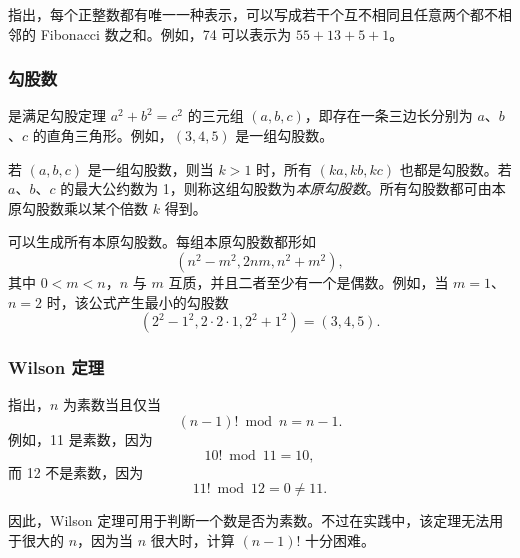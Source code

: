 指出，每个正整数都有唯一一种表示，可以写成若干个互不相同且任意两个都不相邻的 Fibonacci 数之和。例如，74 可以表示为 $55+13+5+1$。

\subsubsection{勾股数}


是满足勾股定理 $a^2+b^2=c^2$ 的三元组 $(a,b,c)$，即存在一条三边长分别为 $a$、$b$、$c$ 的直角三角形。例如，$(3,4,5)$ 是一组勾股数。

若 $(a,b,c)$ 是一组勾股数，则当 $k>1$ 时，所有 $(ka,kb,kc)$ 也都是勾股数。若 $a$、$b$、$c$ 的最大公约数为 1，则称这组勾股数为\emph{本原勾股数}。所有勾股数都可由本原勾股数乘以某个倍数 $k$ 得到。

可以生成所有本原勾股数。每组本原勾股数都形如
\[(n^2-m^2,2nm,n^2+m^2),\]
其中 $0<m<n$，$n$ 与 $m$ 互质，并且二者至少有一个是偶数。例如，当 $m=1$、$n=2$ 时，该公式产生最小的勾股数
\[(2^2-1^2,2\cdot2\cdot1,2^2+1^2)=(3,4,5).\]

\subsubsection{Wilson 定理}


指出，$n$ 为素数当且仅当
\[(n-1)! \bmod n = n-1.\]
例如，11 是素数，因为
\[10! \bmod 11 = 10,\]
而 12 不是素数，因为
\[11! \bmod 12 = 0 \neq 11.\]

因此，Wilson 定理可用于判断一个数是否为素数。不过在实践中，该定理无法用于很大的 $n$，因为当 $n$ 很大时，计算 $(n-1)!$ 十分困难。

